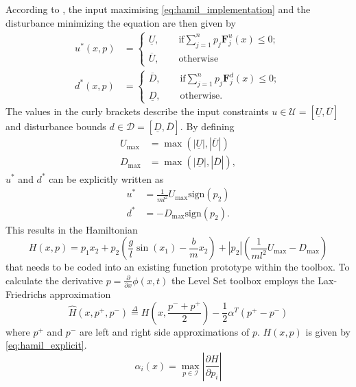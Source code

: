 \documentclass[../main.tex]{subfiles}
\begin{document}
According to \cite{mitchell2004toolbox}, the input maximising \eqref{eq:hamil_implementation} and the disturbance minimizing the equation are then given by 
\begin{align}
    u^*(x,p)&=
\begin{cases}
  \underline{U},\qquad \text{if} \sum_{j=1}^n p_j \textbf{F}^u_j(x)\leq 0;\\
  \overline{U}, \qquad \text{otherwise}
\end{cases}\\
    d^*(x,p)&=
\begin{cases}
  \overline{D},\qquad \text{if} \sum_{j=1}^n p_j \textbf{F}^d_j(x)\leq 0;\\
  \underline{D}, \qquad \text{otherwise}.
\end{cases}
\end{align}
The values in the curly brackets describe the input constraints $u\in \mathcal{U} = [\underline{U},\overline{U}]$ and disturbance bounds $d\in \mathcal{D} = [\underline{D},\overline{D}]$. By defining 
\begin{align}
    U_{\text{max}} &= \max(|\underline{U}|,|\overline{U}|) \\
    D_{\text{max}} &= \max(|\underline{D}|,|\overline{D}|), 
\end{align} 
$u^*$ and $d^*$ can be explicitly written as
\begin{align}
    u^* &= \frac{1}{ml^2} U_{\text{max}} \text{sign}(p_2)\\
    d^* &= -D_{\text{max}} \text{sign}(p_2).
\end{align}
This results in the Hamiltonian
\begin{equation}\label{eq:hamil_explicit}
    H(x,p) = p_1x_2+p_2\left(\frac{g}{l}\sin(x_1)-\frac{b}{m}x_2\right)+|p_2|\left(\frac{1}{ml^2}U_{\text{max}}-D_{\text{max}}\right)
\end{equation}
that needs to be coded into an existing function prototype within the toolbox.
To calculate the derivative $p = \frac{\partial}{\partial x} \phi(x,t)$ the Level Set toolbox employs the Lax-Friedrichs approximation 
\begin{equation}
    \hat{H}(x,p^+,p^-) \overset{\Delta}{=} H\left(x,\frac{p^-+p^+}{2}\right) - \frac{1}{2} \alpha^T(p^+-p^-)
\end{equation}
where $p^+$ and $p^-$ are left and right side approximations of $p$. $H(x,p)$ is given by \eqref{eq:hamil_explicit}.  
\begin{equation}
    \alpha_i(x) = \max_{p\in\mathcal{I}} \left|\frac{\partial H}{\partial p_i}\right|
\end{equation}
\end{document}

